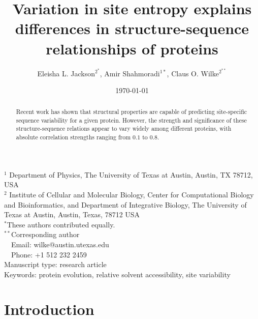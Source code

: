 \documentclass[12pt]{article}
\title{Variation in site entropy explains differences in structure-sequence relationships of proteins}
\author{Eleisha L. Jackson$^{2^*}$, Amir Shahmoradi$^{1*}$, Claus O. Wilke$^{2^{**}}$}
\begin{document}
\date{\today}
\maketitle


\noindent
$^1$ Department of Physics, The University of Texas at Austin, Austin, TX 78712, USA \\
$^2$ Institute of Cellular and Molecular Biology, Center for Computational Biology and Bioinformatics, and Department of Integrative Biology, The University of Texas at Austin, Austin, Texas, 78712 USA\\

\noindent $^{*}$These authors contributed equally. \\

\bigskip
\noindent
$^{**}$Corresponding author\\
$\phantom{^{** }}$Email: wilke@austin.utexas.edu\\
$\phantom{^{**}}$Phone: +1 512 232 2459\\

\bigskip
\noindent
Manuscript type: research article\\
\bigskip
\noindent  Keywords: protein evolution, relative solvent accessibility, site variability


\begin{abstract}
{\color{red}Recent work has shown that structural properties are capable of predicting site-specific sequence variability for a given protein. However, the strength and significance of these structure-sequence relations appear to vary widely among different proteins, with absolute correlation strengths ranging from $0.1$ to $0.8$. }
\end{abstract}
\vfill
\vfill
\def\thefootnote{\fnsymbol{footnote}}
\setcounter{footnote}{0}


\section{Introduction}
\label{sec:intro}
\end{document}
